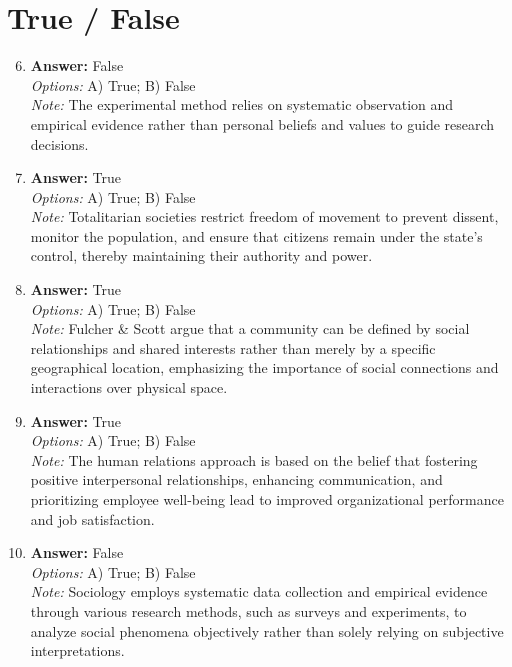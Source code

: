 \documentclass[12pt]{article}
\begin{document}
\section*{True / False}
\begin{enumerate}[label=\arabic*.]
\setcounter{enumi}{5}
\item \textbf{Answer:} False
\\ \textit{Options:} A) True; B) False
\\ \textit{Note:} The experimental method relies on systematic observation and empirical evidence rather than personal beliefs and values to guide research decisions.
\item \textbf{Answer:} True
\\ \textit{Options:} A) True; B) False
\\ \textit{Note:} Totalitarian societies restrict freedom of movement to prevent dissent, monitor the population, and ensure that citizens remain under the state's control, thereby maintaining their authority and power.
\item \textbf{Answer:} True
\\ \textit{Options:} A) True; B) False
\\ \textit{Note:} Fulcher \& Scott argue that a community can be defined by social relationships and shared interests rather than merely by a specific geographical location, emphasizing the importance of social connections and interactions over physical space.
\item \textbf{Answer:} True
\\ \textit{Options:} A) True; B) False
\\ \textit{Note:} The human relations approach is based on the belief that fostering positive interpersonal relationships, enhancing communication, and prioritizing employee well-being lead to improved organizational performance and job satisfaction.
\item \textbf{Answer:} False
\\ \textit{Options:} A) True; B) False
\\ \textit{Note:} Sociology employs systematic data collection and empirical evidence through various research methods, such as surveys and experiments, to analyze social phenomena objectively rather than solely relying on subjective interpretations.
\end{enumerate}
\end{document}
